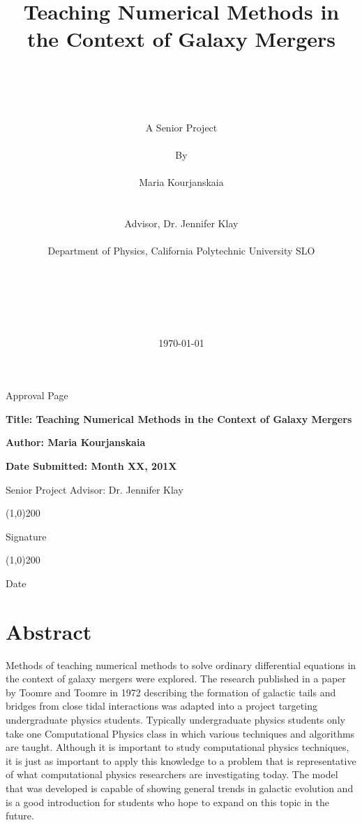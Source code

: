 \documentclass[11pt]{article}
\title{Teaching Numerical Methods in the Context of Galaxy Mergers}
\author
{\\
\\
\\
\\
A Senior Project
\\
\\
By
\\
\\
Maria Kourjanskaia
\\
\\
\\ 
\normalsize{Advisor, Dr. Jennifer Klay}
\\
\\
\normalsize{Department of Physics, California Polytechnic University SLO}\\
\\
\\
\\
\\
\\
}
\date{\today}
\begin{document}
\baselineskip21pt
\maketitle


\newpage

\begin{center}Approval Page\end{center}
\bigskip

\begin{flushleft}
\textbf{Title: Teaching Numerical Methods in the Context of Galaxy Mergers}
\medskip

\textbf{Author: Maria Kourjanskaia}
\medskip

\textbf{Date Submitted: Month XX, 201X}
\end{flushleft}

\bigskip
\bigskip
\bigskip
\bigskip
\bigskip
\bigskip
\bigskip
\bigskip
\bigskip
\bigskip
\bigskip
\bigskip
\bigskip
\bigskip
\bigskip
\bigskip
\bigskip
\bigskip
\bigskip


\begin{flushright}
Senior Project Advisor: Dr. Jennifer Klay

\bigskip
\bigskip


\line(1,0){200}

Signature
\bigskip

\line(1,0){200}

Date



\end{flushright}




\newpage

\tableofcontents

\listoftables

\listoffigures

\newpage

\section{Abstract}
Methods of teaching numerical methods to solve ordinary differential equations in the context of galaxy mergers were explored. The research published in a paper by Toomre and Toomre in 1972 describing the formation of galactic tails and bridges from close tidal interactions was adapted into a project targeting undergraduate physics students. Typically undergraduate physics students only take one Computational Physics class in which various techniques and algorithms are taught. Although it is important to study computational physics techniques, it is just as important to apply this knowledge to a problem that is representative of what computational physics researchers are investigating today. The model that was developed is capable of showing general trends in galactic evolution and is a good introduction for students who hope to expand on this topic in the future.
\end{document}
